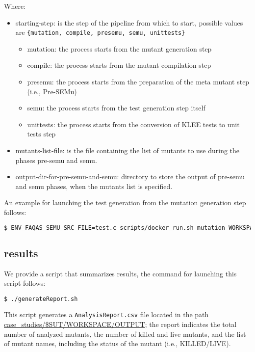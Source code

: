 Where:
\begin{itemize}
	\item starting-step: is the step of the pipeline from which to start, possible values are \texttt{\{mutation, compile, presemu, semu, unittests\}}
	\begin{itemize}
		\item mutation: the process starts from the mutant generation step
		\item compile: the process starts from the mutant compilation step
		\item presemu: the process starts from the preparation of the meta mutant step (i.e., Pre-SEMu)
		\item semu: the process starts from the test generation step itself
		\item unittests: the process starts from the conversion of KLEE tests to unit tests step
	\end{itemize}
	\item mutants-list-file: is the file containing the list of mutants to use during the phases pre-semu and semu.
	\item output-dir-for-pre-semu-and-semu: directory to store the output of pre-semu and semu phases, when the mutants list is specified.
\end{itemize}

An example for launching the test generation from the mutation generation step follows:

\begin{lstlisting}[language=bash]
 $ ENV_FAQAS_SEMU_SRC_FILE=test.c scripts/docker_run.sh mutation WORKSPACE/DOWNLOADED/live_mutants WORKSPACE/OUTPUT/live_mutants_output
\end{lstlisting}

\subsection{\SEMUS results}

We provide a script that summarizes \SEMUS results, the command for launching this script follows:

\begin{lstlisting}[language={}, label=listing:semus_results]
 $ ./generateReport.sh
\end{lstlisting}

This script generates a \texttt{AnalysisReport.csv} file located in the path \url{case_studies/$SUT/WORKSPACE/OUTPUT}; the report indicates the total number of analyzed mutants, the number of killed and live mutants, and the list of mutant names, including the status of the mutant (i.e., KILLED/LIVE).

